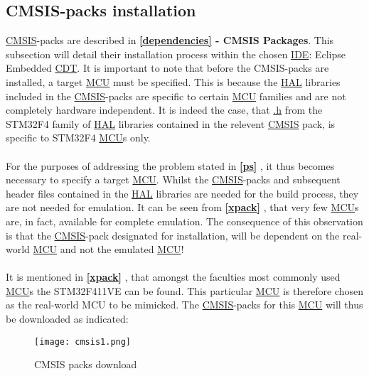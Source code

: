 \subsection{CMSIS-packs installation}
\label{CMSISpacks}
\hyperref[listAbr]{CMSIS}-packs are described in \textbf{\ref{dependencies}  - CMSIS Packages}. This subsection will detail their installation process within the chosen \hyperref[listAbr]{IDE}: Eclipse Embedded \hyperref[listAbr]{CDT}. It is important to note that before the CMSIS-packs are installed, a target \hyperref[listAbr]{MCU} must be specified. This is because the \hyperref[listAbr]{HAL} libraries included in the \hyperref[listAbr]{CMSIS}-packs are specific to certain \hyperref[listAbr]{MCU} families and are not completely hardware independent. It is indeed the case, that \hyperref[listExt]{.h} from the STM32F4 family of \hyperref[listAbr]{HAL} libraries contained in the relevent \hyperref[listAbr]{CMSIS} pack, is specific to STM32F4 \hyperref[listAbr]{MCU}s only. 
\\\\
For the purposes of addressing the problem stated in \textbf{\ref{ps} }, it thus becomes necessary to specify a target \hyperref[listAbr]{MCU}. Whilst the \hyperref[listAbr]{CMSIS}-packs and subsequent header files contained in the \hyperref[listAbr]{HAL} libraries are needed for the build process, they are not needed for emulation. It can be seen from \textbf{\ref{xpack} }, that very few \hyperref[listAbr]{MCU}s are, in fact, available for complete emulation. The consequence of this observation is that the \hyperref[listAbr]{CMSIS}-pack designated for installation, will be dependent on the real-world \hyperref[listAbr]{MCU} and not the emulated \hyperref[listAbr]{MCU}!
\\\\
It is mentioned in \textbf{\ref{xpack} }, that amongst the faculties most commonly used \hyperref[listAbr]{MCU}s the STM32F411VE can be found. This particular \hyperref[listAbr]{MCU} is therefore chosen as the real-world MCU to be mimicked. The \hyperref[listAbr]{CMSIS}-packs for this \hyperref[listAbr]{MCU} will thus be downloaded as indicated:

\begin{figure}[H]
\begin{center}
\texttt{[image: cmsis1.png]}
\caption{CMSIS packs download}
\label{CMSIS1}
\end{center}
\end{figure}

